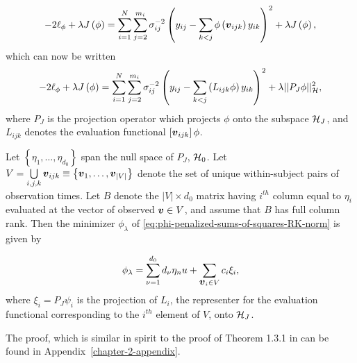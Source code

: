  \begin{equation} \label{eq:phi-penalized-sums-of-squares}
 -2\ell_\phi + \lambda J\left(\phi\right) = \sum_{i=1}^N \sum_{j=2}^{m_i} \sigma^{-2}_{ij}\left( y_{ij} - \sum_{k<j} \phi\left(\mbox{\boldmath $v$}_{ijk}\right) y_{ik}  \right)^2 + \lambda J\left( \phi \right),
 \end{equation}
 \noindent
 which can now be written
 \begin{equation} \label{eq:phi-penalized-sums-of-squares-RK-norm}
-2\ell_\phi + \lambda J\left(\phi\right) = \sum_{i=1}^N \sum_{j=2}^{m_i} \sigma^{-2}_{ij}\left( y_{ij} - \sum_{k<j}\left( L_{ijk}\phi\right) y_{ik}  \right)^2 + \lambda \vert\vert P_J \phi \vert \vert_{\mathcal{H}}^2, 
\end{equation} 
\noindent
where $P_J$ is the projection operator which projects $\phi$ onto the subspace $\mathcal{H}_J$, and $L_{ijk}$ denotes the evaluation functional $\left[\mbox{\boldmath $v$}_{ijk}\right] \phi$. 
 
 \begin{theorem} \label{theorem:finite-dimensional-minimizer}
 Let $\left\{\eta_1,\dots, \eta_{d_0}\right\}$ span the null space of $P_J$, $\mathcal{H}_0$. Let  $V = \bigcup\limits_{i,j,k} \mbox{\boldmath $v$}_{ijk} \equiv \left\{ \mbox{\boldmath $v$}_1,\dots,\mbox{\boldmath $v$}_{\vert V \vert} \right\}$ denote the set of unique within-subject pairs of observation times. Let $B$ denote the $\vert V \vert \times d_0$ matrix having $i^{th}$ column equal to $\eta_i$ evaluated at the vector of observed $\mbox{\boldmath $v$} \in V$, and assume that $B$ has full column rank. Then the minimizer $\phi_\lambda$ of \ref{eq:phi-penalized-sums-of-squares-RK-norm} is given by
 
\begin{equation} \label{eq:form-of-the-minimizer-phi}
\phi_\lambda = \sum_{\nu = 1}^{d_0} d_\nu \eta_nu + \sum_{\mbox{\boldmath $v$}_i \in V} c_i \xi_i,
\end{equation}
\noindent
where $\xi_i = P_J \psi_i$ is the projection of $L_i$, the representer for the evaluation functional corresponding to the $i^{th}$ element of $V$, onto $\mathcal{H}_J$.
\end{theorem}
\vspace{0.5cm}
\noindent
The proof, which is similar in spirit to the proof of Theorem 1.3.1 in \cite{wahba1990spline} can be found in Appendix~\ref{chapter-2-appendix}.

\bigskip

%

